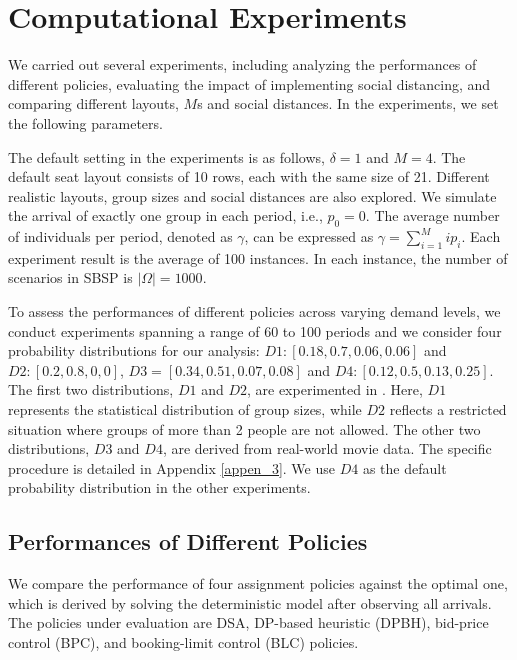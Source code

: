 \section{Computational Experiments}\label{sec_result}
We carried out several experiments, including analyzing the performances of different policies, evaluating the impact of implementing social distancing, and comparing different layouts, $M$s and social distances. In the experiments, we set the following parameters. 

The default setting in the experiments is as follows, $\delta =1$ and $M =4$. The default seat layout consists of 10 rows, each with the same size of 21. Different realistic layouts, group sizes and social distances are also explored. We simulate the arrival of exactly one group in each period, i.e., $p_0 = 0$. The average number of individuals per period, denoted as $\gamma$, can be expressed as $\gamma = \sum_{i=1}^{M} i p_i$. Each experiment result is the average of 100 instances. In each instance, the number of scenarios in SBSP is $|\Omega| = 1000$.

To assess the performances of different policies across varying demand levels, we conduct experiments spanning a range of 60 to 100 periods and we consider four probability distributions for our analysis: $D1:[0.18,0.7,0.06,0.06]$ and $D2:[0.2,0.8,0,0]$, $D3 = [0.34, 0.51, 0.07, 0.08]$ and $D4: [0.12, 0.5, 0.13, 0.25]$. The first two distributions, $D1$ and $D2$, are experimented in \cite{blom2022filling}. Here, $D1$ represents the statistical distribution of group sizes, while $D2$ reflects a restricted situation where groups of more than 2 people are not allowed. The other two distributions, $D3$ and $D4$, are derived from real-world movie data. The specific procedure is detailed in Appendix \ref{appen_3}. We use $D4$ as the default probability distribution in the other experiments.


\subsection{Performances of Different Policies}
We compare the performance of four assignment policies against the optimal one, which is derived by solving the deterministic model after observing all arrivals. The policies under evaluation are DSA, DP-based heuristic (DPBH), bid-price control (BPC), and booking-limit control (BLC) policies.

